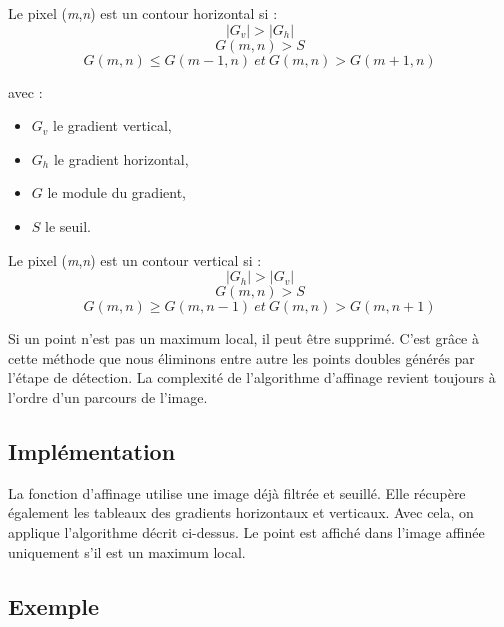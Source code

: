 \documentclass[11pt]{article}
\begin{document}
		Le pixel (\textit{m},\textit{n}) est un contour horizontal si : \\
		$$
			|G_{v}| > |G_{h}| 
		$$	
		$$
			G(m,n) > S 
		$$	
		$$
			G(m,n) \le G(m - 1, n)\ et\ G(m, n) > G(m + 1, n) 
	    $$

	    avec : 
	    \begin{itemize}
		    \item $G_{v}$ le gradient vertical,
		    \item $G_{h}$ le gradient horizontal,
		    \item $G$ le module du gradient,
		    \item $S$ le seuil.

	    \end{itemize}

	    Le pixel (\textit{m},\textit{n}) est un contour vertical si : \\
		$$
			|G_{h}| > |G_{v}| 
		$$	
		$$
			G(m,n) > S 
		$$	
		$$
			G(m,n) \ge G(m, n - 1)\ et\ G(m, n) > G(m , n + 1) 
	    $$


	    Si un point n'est pas un maximum local, il peut être supprimé. 
	    C’est grâce à cette méthode que nous éliminons entre autre les points doubles générés par l’étape de détection. 
	    La complexité de l’algorithme d’affinage revient toujours à l’ordre d’un parcours de l’image.

    \subsection{Implémentation}

    	La fonction d'affinage utilise une image déjà filtrée et seuillé.
    	Elle récupère également les tableaux des gradients horizontaux et verticaux.
    	Avec cela, on applique l'algorithme décrit ci-dessus.
    	Le point est affiché dans l'image affinée uniquement s'il est un maximum local.

    \subsection{Exemple}
\end{document}
